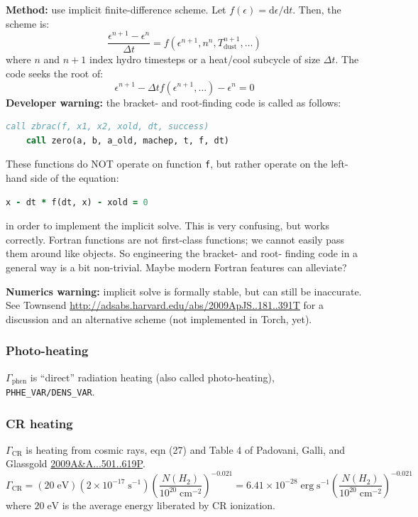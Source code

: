 \documentclass[10pt]{article}
\newcommand*{\mt}{\mathrm}
\newcommand*{\unit}[1]{\;\mt{#1}}  %
\newcommand*{\dtl}{\mathrm{d}}
\begin{document}
\textbf{Method:} use implicit finite-difference scheme.
Let $f\left(\epsilon\right) = \dtl\epsilon/\dtl t$.  Then, the scheme is:
\[
    \frac{\epsilon^{n+1} - \epsilon^{n}}{\Delta t}
    =
    f \left(\epsilon^{n+1}, n^n, T_\mt{dust}^{n+1}, \ldots\right)
\]
where $n$ and $n+1$ index hydro timesteps or a heat/cool subcycle of size
$\Delta t$.  The code seeks the root of:
\[
    \epsilon^{n+1} - \Delta t f \left(\epsilon^{n+1}, \ldots\right) - \epsilon^n = 0
\]
\textbf{Developer warning:} the bracket- and root-finding code is called as follows:
\begin{lstlisting}[language=Fortran]
    call zbrac(f, x1, x2, xold, dt, success)
    call zero(a, b, a_old, machep, t, f, dt)
\end{lstlisting}
These functions do NOT operate on function \texttt{f}, but rather operate on the
left-hand side of the equation:
\begin{lstlisting}[language=Fortran]
    x - dt * f(dt, x) - xold = 0
\end{lstlisting}
in order to implement the implicit solve.  This is very confusing, but works
correctly.
Fortran functions are not first-class
functions; we cannot easily pass them around like objects.  So engineering the
bracket- and root- finding code in a general way is a bit non-trivial.  Maybe
modern Fortran features can alleviate?

\textbf{Numerics warning:} implicit solve is formally stable, but can still be
inaccurate.  See Townsend \url{http://adsabs.harvard.edu/abs/2009ApJS..181..391T}
for a discussion and an alternative scheme (not implemented in Torch, yet).

\subsubsection{Photo-heating}

$\Gamma_\mt{phen}$ is ``direct'' radiation heating (also called
photo-heating), \texttt{PHHE\_VAR/DENS\_VAR}.

\subsubsection{CR heating}

$\Gamma_\mt{CR}$ is heating from cosmic rays, eqn (27) and Table 4 of
Padovani, Galli, and Glassgold
\href{https://ui.adsabs.harvard.edu/abs/2009A\%26A...501..619P/abstract}{2009A\&A...501..619P}.
\[
    \Gamma_\mt{CR} =
        \left(20 \unit{eV}\right) \left(2 \times 10^{-17} \unit{s^{-1}}\right)
        \left( \frac{N(H_2)}{10^{20} \unit{cm^{-2}}} \right)^{-0.021}
    =   6.41 \times 10^{-28} \unit{erg\;s^{-1}}
        \left( \frac{N(H_2)}{10^{20} \unit{cm^{-2}}} \right)^{-0.021}
\]
where $20 \unit{eV}$ is the average energy liberated by CR ionization.
\end{document}
